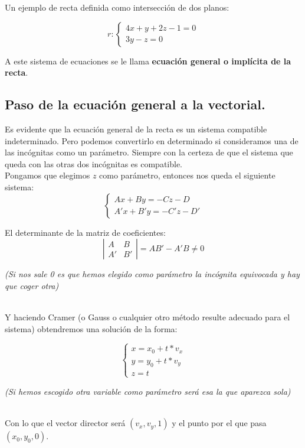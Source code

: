 \documentclass[a4paper,11pt,answers]{exam}
\begin{document}
Un ejemplo de recta definida como intersección de dos planos:

\[r: \left\lbrace\begin{array}{l}
	4x + y + 2z -1 = 0\\
	3y - z = 0
\end{array}\right.\]

A este sistema de ecuaciones se le llama \textbf{ecuación general o implícita de la recta}.
\subsection{Paso de la ecuación general a la vectorial.}
Es evidente que la ecuación general de la recta es un sistema compatible indeterminado. Pero podemos convertirlo en determinado si consideramos una de las incógnitas como un parámetro. Siempre con la certeza de que el sistema que queda con las otras dos incógnitas es compatible.\\

Pongamos que elegimos $z$ como parámetro, entonces nos queda el siguiente sistema:
\[\left\lbrace\begin{array}{l}
	Ax + By= -Cz -D\\
	A'x + B'y = - C'z - D' 
\end{array}\right.\]

El determinante de la matriz de coeficientes:
\[\left|\begin{array}{cc}
	A&B\\
	A'&B'
\end{array}\right| = AB' - A'B \neq 0\]
\begin{small}
	\emph{(Si nos sale 0 es que hemos elegido como parámetro la incógnita equivocada y hay que coger otra)}
\end{small}\\
Y haciendo Cramer (o Gauss o cualquier otro método resulte adecuado para el sistema) obtendremos una solución de la forma:

\[\left\lbrace	\begin{array}{l}
	x = x_0 + t*v_x\\
	y = y_0 + t*v_y\\
	z = t
\end{array}\right. \]

\begin{small}
	\emph{(Si hemos escogido otra variable como parámetro será esa la que aparezca sola)}
\end{small}\\
Con lo que el vector director será $(v_x, v_y, 1)$ y el punto por el que pasa $(x_0, y_0, 0)$.\\
\end{document}
